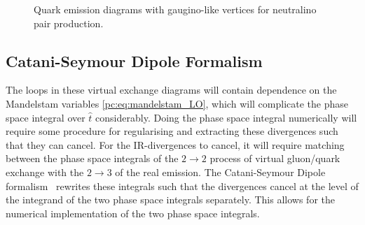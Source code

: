 \documentclass[../main.tex]{subfiles}
\begin{document}
\begin{figure}[ht!]
  \centering
  \begin{subfigure}{0.32\textwidth}
    \centering
    \caption{}
  \end{subfigure}
  \begin{subfigure}{0.32\textwidth}
    \centering
    \caption{}
  \end{subfigure}
  \begin{subfigure}{0.32\textwidth}
    \centering
    \caption{}
  \end{subfigure}
  \begin{subfigure}{0.32\textwidth}
    \centering
    \caption{}
  \end{subfigure}
  \begin{subfigure}{0.32\textwidth}
    \centering
    \caption{}
  \end{subfigure}
  \begin{subfigure}{0.32\textwidth}
    \centering
    \caption{}
  \end{subfigure}
  \caption{Quark emission diagrams with gaugino-like vertices for neutralino pair production.}
  \label{pc:fig:tu_quark_emission}
\end{figure}


\subsection{Catani-Seymour Dipole Formalism}
The loops in these virtual exchange diagrams will contain dependence on the Mandelstam variables \cref{pc:eq:mandelstam_LO}, which will complicate the phase space integral over \(\hat{t}\) considerably.
Doing the phase space integral numerically will require some procedure for regularising and extracting these divergences such that they can cancel.
For the IR-divergences to cancel, it will require matching between the phase space integrals of the \(2 \to 2\) process of virtual gluon/quark exchange with the \(2 \to 3\) of the real emission.
The Catani-Seymour Dipole formalism~\cite{Catani:1996vz} rewrites these integrals such that the divergences cancel at the level of the integrand of the two phase space integrals separately.
This allows for the numerical implementation of the two phase space integrals.
\end{document}
